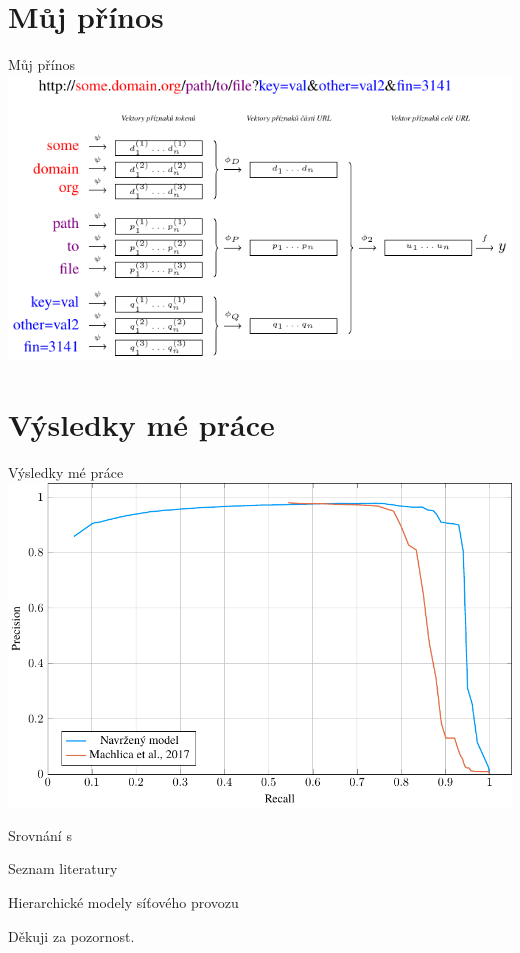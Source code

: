 \documentclass[10pt]{beamer}
\begin{document}
\section{Můj přínos}

\begin{frame}{Můj přínos}
	\includegraphics{images/model_modified_MIL/model_modified_MIL.pdf}

	\centering
\end{frame}

\section{Výsledky mé práce}
\begin{frame}{Výsledky mé práce}
	\centering
	\includegraphics[width=0.9\columnwidth]{images/prior_art/prior_art.pdf}

	Srovnání s \cite{machlica_learning_2017}
\end{frame}

\begin{frame}{Seznam literatury}
	\printbibliography
\end{frame}

\begin{frame}{Hierarchické modely síťového provozu}
	\begin{center}
		\Large{Děkuji za pozornost.}
	\end{center}
\end{frame}
\end{document}
